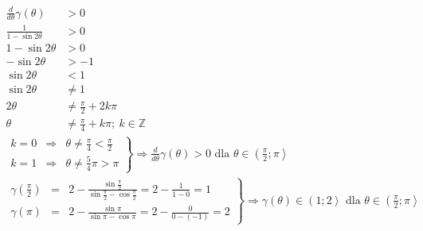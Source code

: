         \begin{align*}
        	\frac{d}{d\theta}\gamma\left( \theta\right)& > 0& \hspace{10cm}\\
        	\frac{
        		1
        	}{
        		1 - \sin 2\theta
        	} & > 0\\
        	1 - \sin 2\theta & > 0\\
        	 -\sin 2\theta & > -1\\
        	 \sin 2\theta & < 1\\
        	 \sin 2\theta & \neq 1\\
        	 2\theta & \neq \frac{\pi}{2} + 2k\pi\\
        	 \theta & \neq \frac{\pi}{4} + k\pi ; \ k \in \mathbb{Z}
        \end{align*}
       	\begin{align*}
       		\left. \begin{array}{rcl}
       		 k = 0 & \Rightarrow & \theta \neq \frac{\pi}{4} < \frac{\pi}{2}  \\
    	 	 k = 1 & \Rightarrow &\theta \neq \frac{5}{4}\pi > \pi
    	 	\end{array}    \right\}\Rightarrow \frac{d}{d\theta}\gamma\left( \theta\right) > 0 \text{ dla } \theta \in \left( \frac{\pi}{2};\pi\right\rangle& \hspace{10cm}
        \end{align*}
       	\begin{align*}
       	\left. \begin{array}{rcl}
       		\gamma\left( \frac{\pi}{2}\right) & = &
       		 2 - \frac{\sin \frac{\pi}{2}}{\sin \frac{\pi}{2} - \cos \frac{\pi}{2}} 
       		 =2 - \frac{1}{1 - 0} = 1\\	
       		\gamma\left( \pi\right) & = &
       		2 - \frac{\sin  \pi}{\sin  \pi - \cos \pi} = 2 - \frac{0}{0 - \left(-1\right)}= 2
       	\end{array} \right\} \Rightarrow \gamma\left( \theta\right) \in \left( 1;2\right\rangle \text{ dla } \theta \in \left( \frac{\pi}{2};\pi\right\rangle& \hspace{10cm}
        \end{align*}